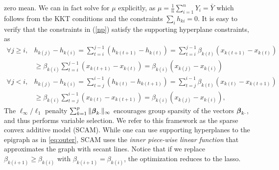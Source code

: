 zero mean. We can in fact solve for $\mu$ explicitly, as  
$\mu = \frac{1}{n} \sum_{i=1}^n Y_i = \bar{Y}$ which follows from the
KKT conditions
and the constraints $\sum_i h_{ki} = 0$.
It is easy to verify that the constraints in (\ref{np}) satisfy the supporting hyperplane constraints, as
\begin{align*}
  \forall j\geq{}i, &h_{k(j)}-h_{k(i)}  = 
            \sum\limits_{t=i}^{j-1}(h_{k(t+1)}-h_{k(t)}) = 
            \sum\limits_{t=i}^{j-1}\beta_{k(t)}(x_{k(t+1)}-x_{k(t)})\\ 
      & \geq \beta_{k(i)}\sum\limits_{t=i}^{j-1}(x_{k(t+1)}-x_{k(t)}) = \beta_{k(i)}(x_{k(j)}-x_{k(i)}) \\
  \forall j<i, &h_{k(j)}-h_{k(i)} =
                \sum\limits_{t=j}^{i-1}(h_{k(t)}-h_{k(t+1)}) = 
                \sum\limits_{t=j}^{i-1}\beta_{k(t)}(x_{k(t)}-x_{k(t+1)}) \\ 
     & \geq \beta_{k(i)}\sum\limits_{t=j}^{i-1}(x_{k(t)}-x_{k(t+1)}) = \beta_{k(i)}(x_{k(j)}-x_{k(i)}), 
\end{align*}
The $\ell_\infty/\ell_1$ penalty
$\sum_{k=1}^{p}\|\boldsymbol{\beta}_{k\cdot}\|_{\infty}$ encourages group
sparsity of the vectors $\boldsymbol{\beta}_{k\cdot}$, and thus performs
variable selection.  We refer to this framework as the sparse convex
additive model (SCAM). While one can use
supporting hyperplanes to the epigraph as in \eqref{eq:outer}, 
SCAM uses the \emph{inner  piece-wise linear function}
that approximates the graph with secant lines. Notice that if we replace $\beta_{k(i+1)} \geq
\beta_{k(i)}$ with $\beta_{k(i+1)}=\beta_{k(i)}$, the optimization
reduces to the lasso.  



